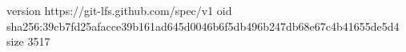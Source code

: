 version https://git-lfs.github.com/spec/v1
oid sha256:39cb7fd25afacce39b161ad645d0046b6f5db496b247db68e67c4b41655de5d4
size 3517
